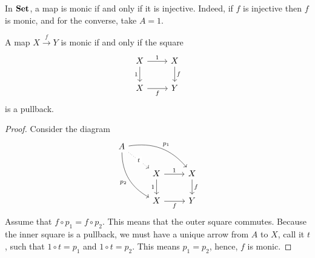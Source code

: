 \begin{example}
    In $\mathbf{Set}$, a map is monic if and only if it is injective. Indeed, if $f$ is injective then $f$ is monic, and for the converse, take $A=1$.
\end{example}

\begin{lemma}
    A map $X\xrightarrow{f}Y$ is monic if and only if the square
    \begin{equation*}
    \begin{tikzcd}
        X \arrow[r, "1"] \arrow[d, "1"'] & X \arrow[d, "f"] \\
        X \arrow[r, "f"'] & Y
    \end{tikzcd}
    \end{equation*}
    is a pullback.
\end{lemma}
\begin{proof}
    Consider the diagram
    \begin{equation*}
    \begin{tikzcd}
        A \arrow[drr, bend left, "p_1"] \arrow[ddr, bend right, "p_2"'] \arrow[dr, dotted, "t"description] \\
        & X \arrow[r, "1"] \arrow[d, "1"'] & X \arrow[d, "f"] \\
        & X \arrow[r, "f"'] & Y
    \end{tikzcd}
    \end{equation*}
    Assume that $f\circ p_1=f\circ p_2$. This means that the outer square commutes. Because the inner square is a pullback, we must have a unique arrow from $A$ to $X$, call it $t$, such that $1\circ t=p_1$ and $1\circ t=p_2$. This means $p_1=p_2$, hence, $f$ is monic.
\end{proof}
